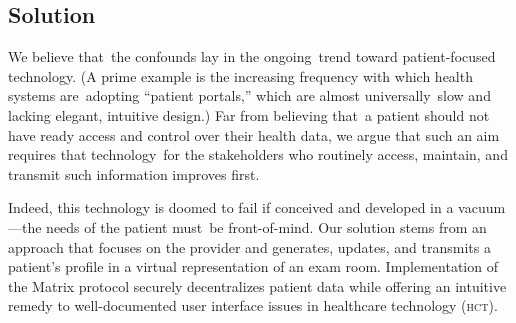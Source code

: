 \subsection{Solution}
We believe that the confounds lay in the ongoing trend toward patient-focused technology. (A prime example is the increasing frequency with which health systems are adopting ``patient portals,'' which are almost universally slow and lacking elegant, intuitive design.) Far from believing that a patient should not have ready access and control over their health data, we argue that such an aim requires that technology for the stakeholders who routinely access, maintain, and transmit such information improves first.%

Indeed, this technology is doomed to fail if conceived and developed in a vacuum---the needs of the patient must be front-of-mind. Our solution stems from an approach that focuses on the provider and generates, updates, and transmits a patient's profile in a virtual representation of an exam room. Implementation of the Matrix protocol securely decentralizes patient data while offering an intuitive remedy to well-documented user interface issues in healthcare technology (\textsc{hct}).%
